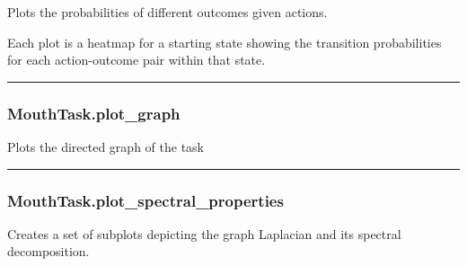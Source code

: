 Plots the probabilities of different outcomes given actions.

Each plot is a heatmap for a starting state showing the transition
probabilities for each action-outcome pair within that state.

\begin{center}\rule{0.5\linewidth}{\linethickness}\end{center}

\subsubsection{MouthTask.plot\_graph}\label{mouthtask.plot_graph}

\begin{Shaded}
\begin{Highlighting}[]
\OperatorTok{=}\OperatorTok{=}\OperatorTok{=}\OperatorTok{=}\OperatorTok{=}\OperatorTok{=}\OperatorTok{=}\OperatorTok{=}\NormalTok{)}
\end{Highlighting}
\end{Shaded}

Plots the directed graph of the task

\begin{center}\rule{0.5\linewidth}{\linethickness}\end{center}

\subsubsection{MouthTask.plot\_spectral\_properties}\label{mouthtask.plot_spectral_properties}

\begin{Shaded}
\begin{Highlighting}[]
\OperatorTok{=}\OperatorTok{=}\OperatorTok{=}\NormalTok{)}
\end{Highlighting}
\end{Shaded}

Creates a set of subplots depicting the graph Laplacian and its spectral
decomposition.

